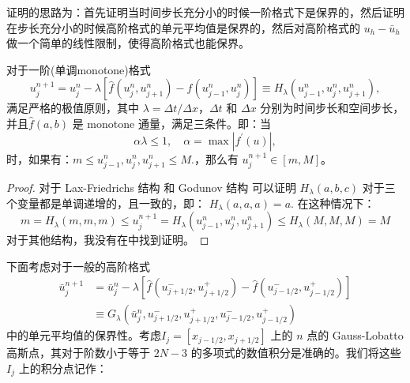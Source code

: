 \documentclass{book}
\begin{document}
证明的思路为：首先证明当时间步长充分小的时候一阶格式下是保界的，然后证明在步长充分小的时候高阶格式的单元平均值是保界的，然后对高阶格式的 $u_h-\bar{u}_h$ 做一个简单的线性限制，使得高阶格式也能保界。

\begin{theorem}
    对于一阶(单调monotone)格式
    \begin{equation}
        u_{j}^{n+1}=u_{j}^{n}-\lambda\left[\hat{f}\left(u_{j}^{n}, u_{j+1}^{n}\right)-\hat{f}\left(u_{j-1}^{n}, u_{j}^{n}\right)\right] \equiv H_{\lambda}\left(u_{j-1}^{n}, u_{j}^{n}, u_{j+1}^{n}\right),
    \end{equation}
    满足严格的极值原则，其中 $\lambda=\Delta t / \Delta x$，$\Delta t$  和  $\Delta x$ 分别为时间步长和空间步长，并且$\hat{f}(a, b)$ 是 monotone 通量，满足三条件。即：当
    \begin{equation}
        \label{eqa:pp_1D_1Order_CFL}
        \alpha \lambda \leq 1, \quad \alpha=\max \left|f^{\prime}(u)\right|,
    \end{equation}
    时，如果有：$m \leq u_{j-1}^{n}, u_{j}^{n}, u_{j+1}^{n} \leq M .$，那么有 $u_{j}^{n+1}\in[m,M]$。
\end{theorem}
\begin{proof}
    对于 Lax-Friedrichs 结构 和 Godunov 结构
    可以证明 $H_{\lambda}(a, b, c)$  对于三个变量都是单调递增的，且一致的，即： $H_{\lambda}(a, a, a)=a$. 在这种情况下：
    \begin{equation}
        m=H_{\lambda}(m, m, m) \leq u_{j}^{n+1}=H_{\lambda}\left(u_{j-1}^{n}, u_{j}^{n}, u_{j+1}^{n}\right) \leq H_{\lambda}(M, M, M)=M
    \end{equation}
    对于其他结构，我没有在\cite{PP-review}中找到证明。
\end{proof}
下面考虑对于一般的高阶格式
\begin{equation}
    \label{eqa:pp_high_order_scheme}
    \begin{aligned}
        \bar{u}_{j}^{n+1} & =\bar{u}_{j}^{n}-\lambda\left[\hat{f}\left(u_{j+1 / 2}^{-}, u_{j+1 / 2}^{+}\right)-\hat{f}\left(u_{j-1 / 2}^{-}, u_{j-1 / 2}^{+}\right)\right] \\
                          & \equiv G_{\lambda}\left(\bar{u}_{j}^{n}, u_{j+1 / 2}^{-}, u_{j+1 / 2}^{+}, u_{j-1 / 2}^{-}, u_{j-1 / 2}^{+}\right)
    \end{aligned}
\end{equation}
中的单元平均值的保界性。考虑$I_{j}=\left[x_{j-1 / 2}, x_{j+1 / 2}\right]$ 上的 $n$ 点的 Gauss-Lobatto 高斯点，其对于阶数小于等于 $2N-3$ 的多项式的数值积分是准确的。我们将这些 $I_{j}$ 上的积分点记作：
\end{document}

